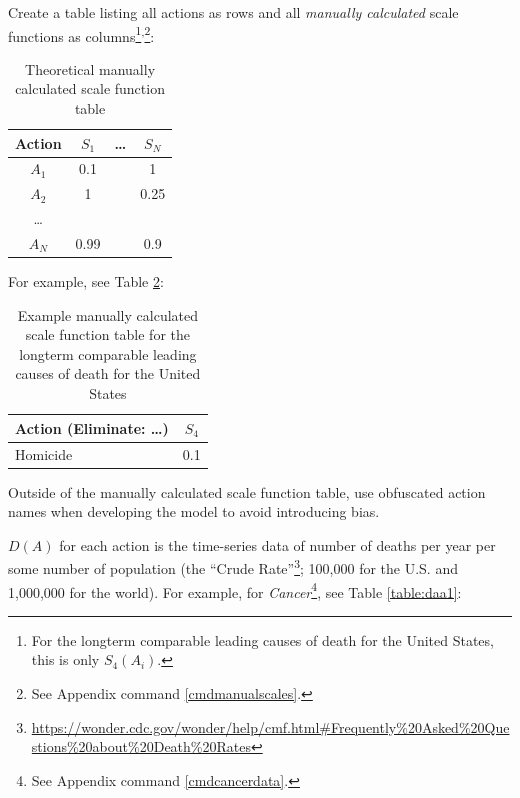 \documentclass[10pt, a4paper, twocolumn]{IEEEconf}
\newcommand\footnotescontinue{\textsuperscript{,}}
\begin{document}
Create a table listing all actions as rows and all \textit{manually calculated} scale functions as columns\footnote{For the longterm comparable leading causes of death for the United States, this is only $S_4(A_i)$.}\footnotescontinue\footnote{See Appendix command \ref{cmdmanualscales}.}:

\begin{table}[H]
  \centering
  \begin{tabular}{cccc}
    \toprule
      Action & $S_1$  & \ldots & $S_N$  \\
    \midrule
      $A_1$  & 0.1    &        & 1      \\
      $A_2$  & 1      &        & 0.25   \\
      \ldots &        &        &        \\
      $A_N$  & 0.99   &        & 0.9    \\
    \bottomrule
  \end{tabular}
  \caption{Theoretical manually calculated scale function table}
  \label{table:scaletable}
\end{table}

For example, see Table \ref{table:exscaletable}:

\begin{table}[H]
  \centering
  \begin{tabular}{lc}
    \toprule
      Action (Eliminate: \ldots) & $S_4$ \\
    \midrule
      Homicide                   & 0.1   \\
    \bottomrule
  \end{tabular}
  \caption{Example manually calculated scale function table for the longterm comparable leading causes of death for the United States}
  \label{table:exscaletable}
\end{table}

Outside of the manually calculated scale function table, use obfuscated action names when developing the model to avoid introducing bias.

$D(A)$ for each action is the time-series data of number of deaths per year per some number of population (the \enquote{Crude Rate}\footnote{\scriptsize{\url{https://wonder.cdc.gov/wonder/help/cmf.html\#Frequently\%20Asked\%20Questions\%20about\%20Death\%20Rates}}}; 100,000 for the U.S. and 1,000,000 for the world).
For example, for \textit{Cancer}\footnote{See Appendix command \ref{cmdcancerdata}.}, see Table \ref{table:daa1}:
\end{document}
